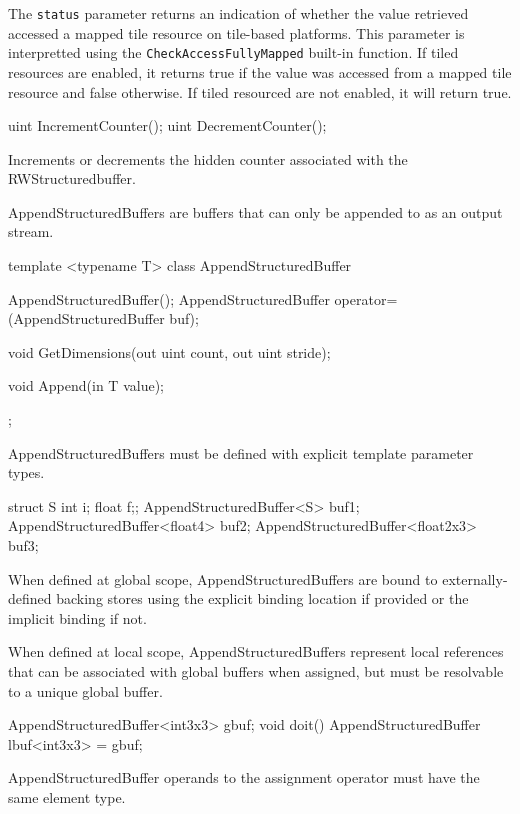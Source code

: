 The \texttt{status} parameter returns an indication of whether the value retrieved accessed a mapped tile
resource on tile-based platforms. This parameter is interpretted using the \texttt{CheckAccessFullyMapped}
built-in function. If tiled resources are enabled, it returns true if the value was accessed from a mapped
tile resource and false otherwise. If tiled resourced are not enabled, it will return true.


\begin{HLSL}
   uint IncrementCounter();
   uint DecrementCounter();
\end{HLSL}

Increments or decrements the hidden counter associated with the RWStructuredbuffer.


AppendStructuredBuffers are buffers that can only be appended to as an output stream.

\begin{HLSL}
template <typename T>
 class AppendStructuredBuffer {
   AppendStructuredBuffer();
   AppendStructuredBuffer operator=(AppendStructuredBuffer buf);

   void GetDimensions(out uint count, out uint stride);

   void Append(in T value);
};
\end{HLSL}


AppendStructuredBuffers must be defined with explicit template parameter types.
\begin{HLSL}
  struct S {int i; float f;};
  AppendStructuredBuffer<S> buf1;
  AppendStructuredBuffer<float4> buf2;
  AppendStructuredBuffer<float2x3> buf3;
\end{HLSL}

When defined at global scope, AppendStructuredBuffers are bound to externally-defined backing stores
using the explicit binding location if provided or the implicit binding if not.

When defined at local scope, AppendStructuredBuffers represent local references
that can be associated with global buffers when assigned,
but must be resolvable to a unique global buffer.

\begin{HLSL}
  AppendStructuredBuffer<int3x3> gbuf;
  void doit() {
    AppendStructuredBuffer lbuf<int3x3> = gbuf;
  }
\end{HLSL}
AppendStructuredBuffer operands to the assignment operator must have the same element type.

